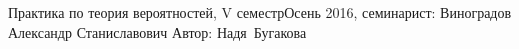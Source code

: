 


\BigHeader
    {Практика по теория вероятностей, V семестр}{Осень 2016, семинарист: Виноградов Александр Станиславович}
    {Автор: Надя~Бугакова}
\gdef\LectureName{Теор. вер-тей, V семестр}



